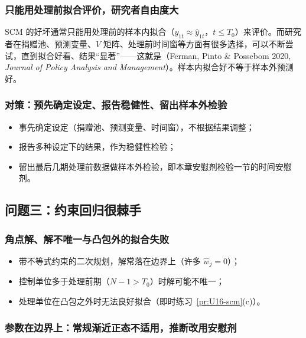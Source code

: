 \subsubsection{只能用处理前拟合评价，研究者自由度大}

SCM 的好坏通常只能用处理前的样本内拟合（$y_{1t}\approx\hat y_{1t}$，$t\le T_0$）来评价。而研究者在捐赠池、预测变量、$V$ 矩阵、处理前时间窗等方面有很多选择，可以不断尝试，直到拟合好看、结果“显著”——这就是（Ferman, Pinto \& Possebom 2020, \emph{Journal of Policy Analysis and Management}）。样本内拟合好不等于样本外预测好。

\subsubsection{对策：预先确定设定、报告稳健性、留出样本外检验}

\begin{itemize}
  \item 事先确定设定（捐赠池、预测变量、时间窗），不根据结果调整；
  \item 报告多种设定下的结果，作为稳健性检验；
  \item 留出最后几期处理前数据做样本外检验，即本章安慰剂检验一节的时间安慰剂。
\end{itemize}

\subsection{问题三：约束回归很棘手}

\subsubsection{角点解、解不唯一与凸包外的拟合失败}

\begin{itemize}
  \item 带不等式约束的二次规划，解常落在边界上（许多 $\hat w_j=0$）；
  \item 控制单位多于处理前期（$N-1>T_0$）时解可能不唯一；
  \item 处理单位在凸包之外时无法良好拟合（即时练习~\ref{pr:U16-scm}(c)）。
\end{itemize}

\subsubsection{参数在边界上：常规渐近正态不适用，推断改用安慰剂}

